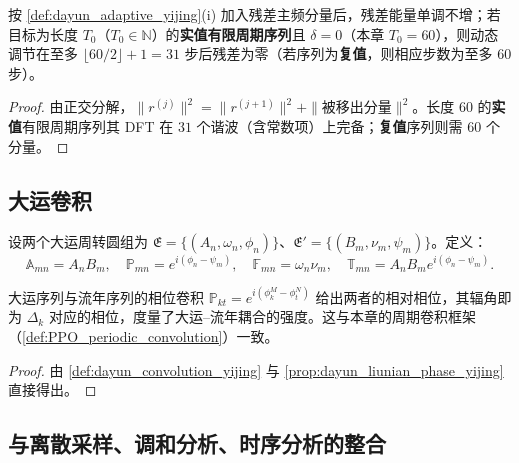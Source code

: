 \begin{proposition}[大运动态调节的单调性与收敛性]\label{prop:dayun_adaptive_convergence_yijing}
按 \cref{def:dayun_adaptive_yijing}(i) 加入残差主频分量后，残差能量单调不增；若目标为长度 $T_0$（$T_0\in\mathbb N$）的\textbf{实值有限周期序列}且 $\delta=0$（本章 $T_0=60$），则动态调节在至多 $\lfloor 60/2\rfloor+1=31$ 步后残差为零（若序列为\textbf{复值}，则相应步数为至多 $60$ 步）。
\end{proposition}

\begin{proof}
由正交分解，$\|r^{(j)}\|^2=\|r^{(j+1)}\|^2+\|\text{被移出分量}\|^2$。长度 $60$ 的\textbf{实值}有限周期序列其 DFT 在 $31$ 个谐波（含常数项）上完备；\textbf{复值}序列则需 $60$ 个分量。
\end{proof}

\subsection{大运卷积}

\begin{definition}\label{def:dayun_convolution_yijing}
设两个大运周转圆组为 $\mathfrak E=\{(A_n,\omega_n,\phi_n)\}$、$\mathfrak E'=\{(B_m,\nu_m,\psi_m)\}$。定义：
\[
\mathbb A_{mn}=A_nB_m,\quad \mathbb P_{mn}=e^{i(\phi_n-\psi_m)},\quad \mathbb F_{mn}=\omega_n\nu_m,\quad \mathbb T_{mn}=A_nB_m e^{i(\phi_n-\psi_m)}.
\]
\end{definition}

\begin{proposition}[大运与流年的相位卷积]\label{prop:dayun_liunian_convolution_yijing}
大运序列与流年序列的相位卷积 $\mathbb P_{kt}=e^{i(\phi_k^M-\phi_t^N)}$ 给出两者的相对相位，其辐角即为 $\Delta_k$ 对应的相位，度量了大运--流年耦合的强度。这与本章的周期卷积框架（\cref{def:PPO_periodic_convolution}）一致。
\end{proposition}

\begin{proof}
由 \cref{def:dayun_convolution_yijing} 与 \cref{prop:dayun_liunian_phase_yijing} 直接得出。
\end{proof}

\subsection{与离散采样、调和分析、时序分析的整合}

